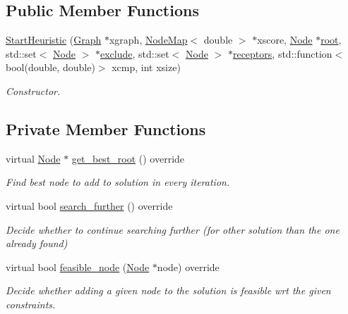 \subsection*{Public Member Functions}
\begin{DoxyCompactItemize}
\item 
\hyperlink{classderegnet_1_1StartHeuristic_aff83b16a2ae0fd4041f19f787a0da23f}{Start\+Heuristic} (\hyperlink{namespacederegnet_a55b76c55bbabc682cbc61f8b9948799e}{Graph} $\ast$xgraph, \hyperlink{namespacederegnet_ae102b707ae1d6f83c639ece5e0dd5658}{Node\+Map}$<$ double $>$ $\ast$xscore, \hyperlink{namespacederegnet_a744bad34f2de9856d36715a445f027f3}{Node} $\ast$\hyperlink{classderegnet_1_1DeregnetStartHeuristic_a4605d41352e3adf1f9f9f32466a4e61e}{root}, std\+::set$<$ \hyperlink{namespacederegnet_a744bad34f2de9856d36715a445f027f3}{Node} $>$ $\ast$\hyperlink{classderegnet_1_1DeregnetStartHeuristic_aa22c6581cd404bf7ac325850b28dc951}{exclude}, std\+::set$<$ \hyperlink{namespacederegnet_a744bad34f2de9856d36715a445f027f3}{Node} $>$ $\ast$\hyperlink{classderegnet_1_1DeregnetStartHeuristic_ab80c046ff2b7c64086fceb84987b3e50}{receptors}, std\+::function$<$ bool(double, double)$>$ xcmp, int xsize)
\begin{DoxyCompactList}\small\item\em Constructor. \end{DoxyCompactList}\end{DoxyCompactItemize}
\subsection*{Private Member Functions}
\begin{DoxyCompactItemize}
\item 
virtual \hyperlink{namespacederegnet_a744bad34f2de9856d36715a445f027f3}{Node} $\ast$ \hyperlink{classderegnet_1_1StartHeuristic_a84ed02caf211e22b663e4e3c0d5b4f24}{get\+\_\+best\+\_\+root} () override
\begin{DoxyCompactList}\small\item\em Find best node to add to solution in every iteration. \end{DoxyCompactList}\item 
virtual bool \hyperlink{classderegnet_1_1StartHeuristic_acbc34cb7479d3e68d6ef0554b739fc52}{search\+\_\+further} () override
\begin{DoxyCompactList}\small\item\em Decide whether to continue searching further (for other solution than the one already found) \end{DoxyCompactList}\item 
virtual bool \hyperlink{classderegnet_1_1StartHeuristic_a1d7931058aceb84790f861a39f0a8bfd}{feasible\+\_\+node} (\hyperlink{namespacederegnet_a744bad34f2de9856d36715a445f027f3}{Node} $\ast$node) override
\begin{DoxyCompactList}\small\item\em Decide whether adding a given node to the solution is feasible wrt the given constraints. \end{DoxyCompactList}\end{DoxyCompactItemize}
